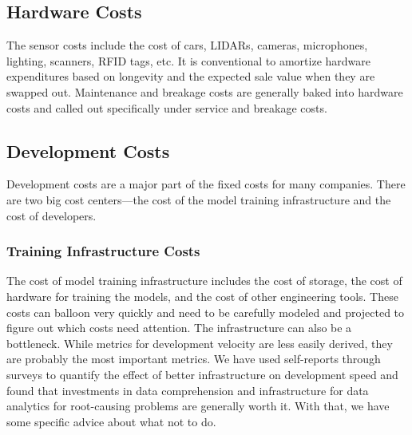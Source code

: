 \documentclass[12pt, letterpaper]{article}
\begin{document}
\subsection{Hardware Costs}
The sensor costs include the cost of cars, LIDARs, cameras, microphones, lighting, scanners, RFID tags, etc. It is conventional to amortize hardware expenditures based on longevity and the expected sale value when they are swapped out. Maintenance and breakage costs are generally baked into hardware costs and called out specifically under service and breakage costs. 

\subsection{Development Costs}
Development costs are a major part of the fixed costs for many companies. There are two big cost centers—the cost of the model training infrastructure and the cost of developers. 
\subsubsection{Training Infrastructure Costs}
The cost of model training infrastructure includes the cost of storage, the cost of hardware for training the models, and the cost of other engineering tools. These costs can balloon very quickly and need to be carefully modeled and projected to figure out which costs need attention.  The infrastructure can also be a bottleneck. While metrics for development velocity are less easily derived, they are probably the most important metrics. We have used self-reports through surveys to quantify the effect of better infrastructure on development speed and found that investments in data comprehension and infrastructure for data analytics for root-causing problems are generally worth it. With that, we have some specific advice about what not to do.
\end{document}
